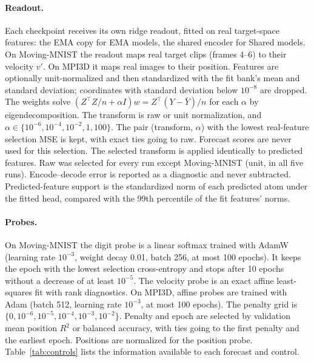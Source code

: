 \paragraph{Readout.} Each checkpoint receives its own ridge readout, fitted on real target-space features: the EMA copy for EMA models, the shared encoder for Shared models. On Moving-MNIST the readout maps real target clips (frames 4--6) to their velocity $v'$. On MPI3D it maps real images to their position. Features are optionally unit-normalized and then standardized with the fit bank's mean and standard deviation; coordinates with standard deviation below $10^{-8}$ are dropped. The weights solve $(Z^\top Z/n+\alpha I)w=Z^\top(Y-\bar Y)/n$ for each $\alpha$ by eigendecomposition. The transform is raw or unit normalization, and $\alpha\in\{10^{-6},10^{-4},10^{-2},1,100\}$. The pair (transform, $\alpha$) with the lowest real-feature selection MSE is kept, with exact ties going to raw. Forecast scores are never used for this selection. The selected transform is applied identically to predicted features. Raw was selected for every run except Moving-MNIST \shdet{} (unit, in all five runs). Encode--decode error is reported as a diagnostic and never subtracted. Predicted-feature support is the standardized norm of each predicted atom under the fitted head, compared with the 99th percentile of the fit features' norms.

\paragraph{Probes.} On Moving-MNIST the digit probe is a linear softmax trained with AdamW (learning rate $10^{-3}$, weight decay 0.01, batch 256, at most 100 epochs). It keeps the epoch with the lowest selection cross-entropy and stops after 10 epochs without a decrease of at least $10^{-5}$. The velocity probe is an exact affine least-squares fit with rank diagnostics. On MPI3D, affine probes are trained with Adam (batch 512, learning rate $10^{-3}$, at most 100 epochs). The penalty grid is $\{0,10^{-6},10^{-5},10^{-4},10^{-3},10^{-2}\}$. Penalty and epoch are selected by validation mean position $R^2$ or balanced accuracy, with ties going to the first penalty and the earliest epoch. Positions are normalized for the position probe. Table~\ref{tab:controls} lists the information available to each forecast and control.

